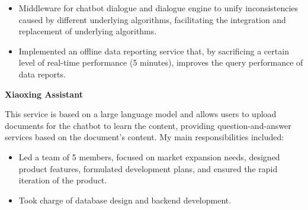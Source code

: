 \documentclass[a4paper]{article}
\newenvironment{changemargin}[2]{%
  \begin{list}{}{%
    \setlength{\topsep}{0pt}%
    \setlength{\leftmargin}{#1}%
    \setlength{\rightmargin}{#2}%
    \setlength{\listparindent}{\parindent}%
    \setlength{\itemindent}{\parindent}%
    \setlength{\parsep}{\parskip}%
  }%
  \item[]}{\end{list}
}
\newenvironment{body} {
	\vspace*{-16pt}
	\begin{changemargin}{-0.5in}{-0.5in}
  }
	{\end{changemargin}
}
\begin{document}
\begin{body}
	\vspace*{-8pt}
	\begin{itemize} \itemsep -0pt  %
		\item \begin{justify}
			Middleware for chatbot dialogue and dialogue engine to unify inconsistencies caused by different underlying algorithms, facilitating the integration and replacement of underlying algorithms.
		\end{justify} 
	\end{itemize}

	\vspace*{-8pt}
	\begin{itemize} \itemsep -0pt  %
		\item \begin{justify}
			Implemented an offline data reporting service that, by sacrificing a certain level of real-time performance (5 minutes), improves the query performance of data reports.
		\end{justify} 
	\end{itemize}

	\medskip

	\textbf{Xiaoxing Assistant} \\

	\begin{justify} 
		This service is based on a large language model and allows users to upload documents for the chatbot to learn the content, providing question-and-answer services based on the document's content. My main responsibilities included:
	\end{justify}
	\smallskip

	\vspace*{-8pt}
	\begin{itemize} \itemsep -0pt  %
		\item \begin{justify} 
			Led a team of 5 members, focused on market expansion needs, designed product features, formulated development plans, and ensured the rapid iteration of the product.
		\end{justify} 
	\end{itemize}

	\vspace*{-8pt}
	\begin{itemize} \itemsep -0pt  %
		\item \begin{justify} 
			Took charge of database design and backend development.
		\end{justify} 
	\end{itemize}


\end{body}
\end{document}
